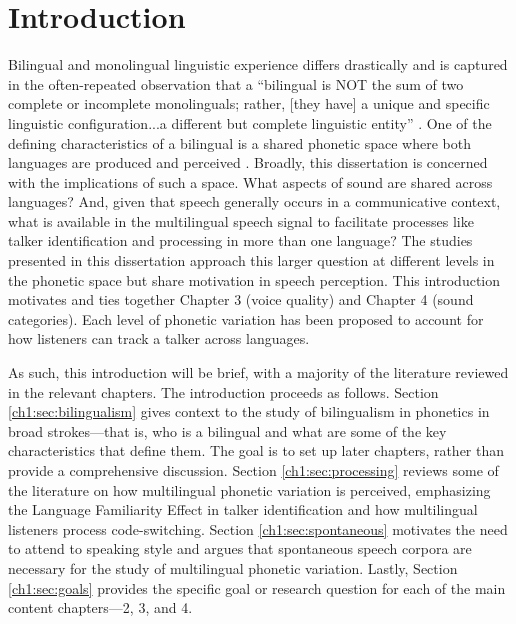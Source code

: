 
\chapter{Introduction}\label{ch:Introduction}

Bilingual and monolingual linguistic experience differs drastically and is captured in the often-repeated observation that a ``bilingual is NOT the sum of two complete or incomplete monolinguals; rather, [they have] a unique and specific linguistic configuration...a different but complete linguistic entity'' \citep[][p. 6]{grosjean_1989_bilingual}. One of the defining characteristics of a bilingual is a shared phonetic space where both languages are produced and perceived \citep{flege_2021_slmr}. Broadly, this dissertation is concerned with the implications of such a space. What aspects of sound are shared across languages? And, given that speech generally occurs in a communicative context, what is available in the multilingual speech signal to facilitate processes like talker identification and processing in more than one language? The studies presented in this dissertation approach this larger question at different levels in the phonetic space but share motivation in speech perception. This introduction motivates and ties together Chapter 3 (voice quality) and Chapter 4 (sound categories). Each level of phonetic variation has been proposed to account for how listeners can track a talker across languages. 

As such, this introduction will be brief, with a majority of the literature reviewed in the relevant chapters. The introduction proceeds as follows. Section \ref{ch1:sec:bilingualism} gives context to the study of bilingualism in phonetics in broad strokes---that is, who is a bilingual and what are some of the key characteristics that define them. The goal is to set up later chapters, rather than provide a comprehensive discussion. Section \ref{ch1:sec:processing} reviews some of the literature on how multilingual phonetic variation is perceived, emphasizing the Language Familiarity Effect in talker identification and how multilingual listeners process code-switching. Section \ref{ch1:sec:spontaneous} motivates the need to attend to speaking style and argues that spontaneous speech corpora are necessary for the study of multilingual phonetic variation. Lastly, Section \ref{ch1:sec:goals} provides the specific goal or research question for each of the main content chapters---2, 3, and 4.%

